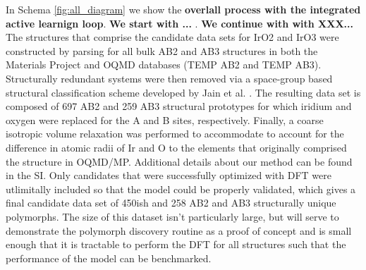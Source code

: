 

In Schema \ref{fig:all_diagram} we show the {\bf overlall process with the integrated active learnign loop}. {\bf We start with ...} .  {\bf We continue with  with XXX...}
The structures that comprise the candidate data sets for IrO2 and IrO3 were constructed by parsing for all bulk AB2 and AB3 structures in both the Materials Project\cite{Jain2013} and OQMD\cite{Kirklin2015} databases (TEMP AB2 and TEMP AB3).
%
Structurally redundant systems were then removed via a space-group based structural classification scheme developed by Jain et al. \cite{Jain2018}.
%
The resulting data set is composed of 697 AB2 and 259 AB3 structural prototypes for which iridium and oxygen were replaced for the A and B sites, respectively.
%
Finally, a coarse isotropic volume relaxation was performed to accommodate to account for the difference in atomic radii of Ir and O to the elements that originally comprised the structure in OQMD/MP.
%
Additional details about our method can be found in the SI.
%
Only candidates that were successfully optimized with DFT were utlimitally included so that the model could be properly validated, which gives a final candidate data set of 450ish and 258 AB2 and AB3 structurally unique polymorphs.
%
The size of this dataset isn't particularly large, but will serve to demonstrate the polymorph discovery routine as a proof of concept and is small enough that it is tractable to perform the DFT for all structures such that the performance of the model can be benchmarked.


